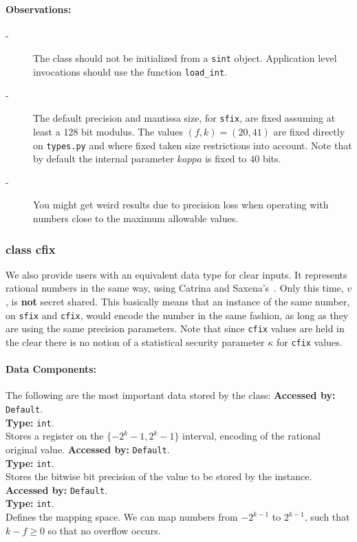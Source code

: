 \paragraph{Observations:}
\begin{description}
  \item[-] The class should not be initialized from a \verb|sint| object.
        Application level invocations should use the function \verb|load_int|.
  \item[-] The default precision and mantissa size, for \verb|sfix|, are fixed assuming at least a 128 bit modulus.
        The values $(f,k)=(20,41)$ are fixed directly on \verb|types.py| and where fixed taken size restrictions into account.
        Note that by default the internal parameter $kappa$ is fixed to $40$ bits.
  \item[-] You might get weird results due to precision loss  when operating with numbers close to the maximum allowable values.
\end{description}

\subsubsection{class cfix}
We also provide users with an equivalent data type for clear inputs.
It represents rational numbers in the same way, using Catrina and Saxena's~\cite{CS10}.
Only this time, $v$, is \textbf{not} secret shared.
This basically means that an instance of the same number, on \verb|sfix| and \verb|cfix|,
would  encode the number in the same fashion, as long as they are using
the same precision parameters.
Note that since \verb|cfix| values are held in the clear there is no notion
of a statistical security parameter $\kappa$ for \verb|cfix| values.

\paragraph{Data Components:}
The following are the most important data stored by the class:
\textbf{Accessed by:} \verb|Default|.\\
\textbf{Type:} \verb|int|.\\
Stores a register on the $\{-2^k-1, 2^k-1\}$ interval, encoding of the rational original value.
\textbf{Accessed by:} \verb|Default|.\\
\textbf{Type:} \verb|int|.\\
Stores the bitwise bit precision of the value to be stored by the instance.
\textbf{Accessed by:} \verb|Default|.\\
\textbf{Type:} \verb|int|.\\
Defines the mapping space. We can map numbers  from $-2^{k-1}$ to $2^{k-1}$, such that $k-f \geq 0$ so that no overflow occurs.


